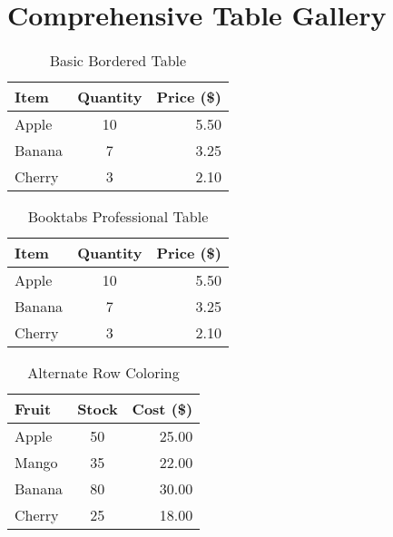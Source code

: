 \documentclass[12pt,a4paper]{article}
\begin{document}
	\section*{Comprehensive Table Gallery}
	
	\begin{table}[H]
		\centering
		\caption{Basic Bordered Table}
		\begin{tabular}{|l|c|r|}
			\hline
			Item & Quantity & Price (\$) \\
			\hline
			Apple & 10 & 5.50 \\
			Banana & 7 & 3.25 \\
			Cherry & 3 & 2.10 \\
			\hline
		\end{tabular}
	\end{table}
	
	\begin{table}[H]
		\centering
		\caption{Booktabs Professional Table}
		\begin{tabular}{lcr}
			\toprule
			\textbf{Item} & \textbf{Quantity} & \textbf{Price (\$)} \\
			\midrule
			Apple & 10 & 5.50 \\
			Banana & 7 & 3.25 \\
			Cherry & 3 & 2.10 \\
			\bottomrule
		\end{tabular}
	\end{table}
	
	\begin{table}[H]
		\centering
		\caption{Alternate Row Coloring}
		\begin{tabular}{l c r}
			\toprule
			\textbf{Fruit} & \textbf{Stock} & \textbf{Cost (\$)} \\
			\midrule
			Apple & 50 & 25.00 \\
			Mango & 35 & 22.00 \\
			Banana & 80 & 30.00 \\
			Cherry & 25 & 18.00 \\
			\bottomrule
		\end{tabular}
	\end{table}
	
\end{document}
